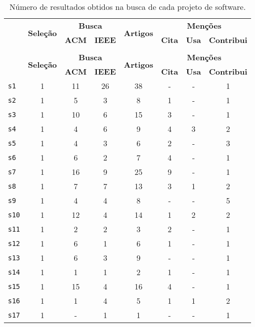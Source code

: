 \begin{longtable}{ l c c c c c c c }
\caption{Número de resultados obtidos na busca de cada projeto de software.}
\label{references-table} \\
  \hline
  \hhline{ l c c c c c c c |}
  \endfirsthead
  \hhline{ l c c c c c c c |}
  \hline
   \multirow{2}{*}{\textbf{ID}} & \multirow{2}{*}{\textbf{Seleção}} & \multicolumn{2}{c}{{\bf Busca}} & \multirow{2}{*}{\textbf{Artigos}} & \multicolumn{3}{c}{{\bf Menções}} \\
   & & \textbf{ACM} & \textbf{IEEE} & & \textbf{Cita} & \textbf{Usa} & \textbf{Contribui} \\
  \hline
  \hhline{ l c c c c c c c |}
  \endhead
  \hhline{--------}
  \multicolumn{8}{c}{continua na próxima página} \\
  \hhline{--------} \endfoot
  \hhline{--------} \endlastfoot
   \multirow{2}{*}{\textbf{ID}} & \multirow{2}{*}{\textbf{Seleção}} & \multicolumn{2}{c}{{\bf Busca}} & \multirow{2}{*}{\textbf{Artigos}} & \multicolumn{3}{c}{{\bf Menções}} \\
   & & \textbf{ACM} & \textbf{IEEE} & & \textbf{Cita} & \textbf{Usa} & \textbf{Contribui} \\
  \hline
\texttt{s1} & 1 & 11 & 26 & 38 & - & - & 1 \\
\texttt{s2} & 1 & 5 & 3 & 8 & 1 & - & 1 \\
\texttt{s3} & 1 & 10 & 6 & 15 & 3 & - & 1 \\
\texttt{s4} & 1 & 4 & 6 & 9 & 4 & 3 & 2 \\
\texttt{s5} & 1 & 4 & 3 & 6 & 2 & - & 3 \\
\texttt{s6} & 1 & 6 & 2 & 7 & 4 & - & 1 \\
\texttt{s7} & 1 & 16 & 9 & 25 & 9 & - & 1 \\
\texttt{s8} & 1 & 7 & 7 & 13 & 3 & 1 & 2 \\
\texttt{s9} & 1 & 4 & 4 & 8 & - & - & 5 \\
\texttt{s10} & 1 & 12 & 4 & 14 & 1 & 2 & 2 \\
\texttt{s11} & 1 & 2 & 2 & 3 & 2 & - & 1 \\
\texttt{s12} & 1 & 6 & 1 & 6 & 1 & - & 1 \\
\texttt{s13} & 1 & 6 & 3 & 9 & - & - & 1 \\
\texttt{s14} & 1 & 1 & 1 & 2 & 1 & - & 1 \\
\texttt{s15} & 1 & 15 & 4 & 16 & 4 & - & 1 \\
\texttt{s16} & 1 & 1 & 4 & 5 & 1 & 1 & 2 \\
\texttt{s17} & 1 & - & 1 & 1 & - & - & 1 \\

\end{longtable}
